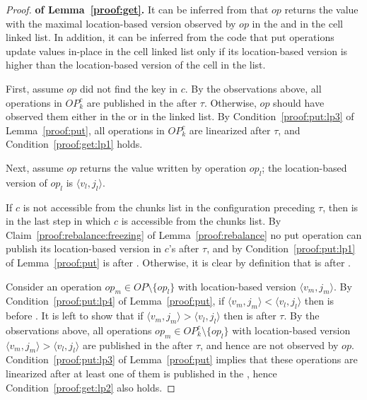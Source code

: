 \begin{proof}\textbf{of Lemma~\ref{proof:get}.}
It can be inferred from  that $op$ returns the value with the maximal location-based version observed by $op$ in the  and in the cell linked list. In addition, it can be inferred from the code that put operations update values in-place in the cell linked list only if its location-based version is higher than the location-based version of the cell in the list.

First, assume $op$ did not find the key in $c$. By the observations above, all operations in $OP_k^c$ are published in the  after $\tau$. Otherwise, $op$ should have observed them either in the  or in the linked list. By Condition~\ref{proof:put:lp3} of Lemma~\ref{proof:put}, all operations in $OP_k^c$ are linearized after $\tau$, and Condition~\ref{proof:get:lp1} holds.

Next, assume $op$ returns the value written by operation $op_l$;
the location-based version of $op_l$ is $\langle v_l, j_l\rangle$. 

If $c$ is not accessible from the chunks list in the configuration preceding $\tau$, then  is in the last step in which $c$ is accessible from the chunks list. By Claim~\ref{proof:rebalance:freezing} of Lemma~\ref{proof:rebalance} no put operation can publish its location-based version in $c$'s  after $\tau$, and by Condition~\ref{proof:put:lp1} of Lemma~\ref{proof:put}   is after  . Otherwise, it is clear by definition that  is after  .

Consider an operation $op_m \in OP\setminus\{op_l\}$ with location-based version $\langle v_m, j_m\rangle$.
By Condition~\ref{proof:put:lp4} of Lemma~\ref{proof:put}, if $\langle v_m, j_m\rangle < \langle v_l, j_l\rangle$ then  is before . It is left to show that if $\langle v_m, j_m\rangle > \langle v_l, j_l\rangle$ then  is after $\tau$. By the observations above, all operations $op_m \in OP_k^c\setminus\{op_l\}$ with location-based version $\langle v_m, j_m\rangle > \langle v_l, j_l\rangle$ are published in the  after $\tau$, and hence are not observed by $op$. Condition~\ref{proof:put:lp3} of Lemma~\ref{proof:put} implies that these operations are linearized after at least one of them is published in the , hence Condition~\ref{proof:get:lp2} also holds.
\end{proof}


